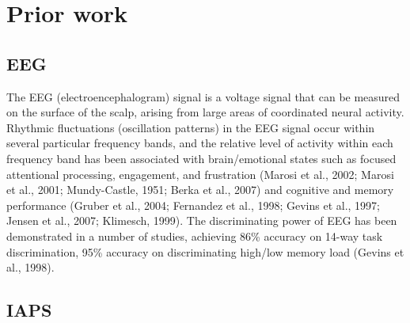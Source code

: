 \documentclass{article} %
\begin{document}
\section{Prior work} \label{section:litreview}
\subsection{EEG}
The EEG (electroencephalogram) signal is a voltage signal that can be measured on the surface of the scalp, arising from large areas of coordinated neural activity. Rhythmic fluctuations (oscillation patterns) in the EEG signal occur within several particular frequency bands, and the relative level of activity within each frequency band has been associated with brain/emotional states such as focused attentional processing, engagement, and frustration (Marosi et al., 2002; Marosi et al., 2001;
Mundy-Castle, 1951; Berka et al., 2007) and cognitive and memory performance (Gruber et al., 2004; Fernandez et al., 1998; Gevins et al., 1997; Jensen et al., 2007; Klimesch, 1999). The discriminating power of EEG has been demonstrated in a number of studies, achieving 86\% accuracy on 14-way task discrimination, 95\% accuracy on discriminating high/low memory load (Gevins et al., 1998). 
\subsection{IAPS}
\end{document}
